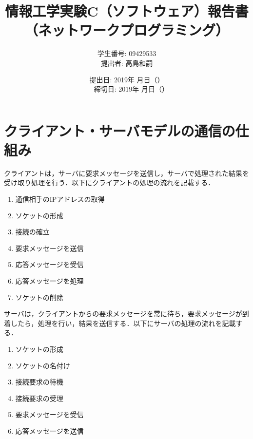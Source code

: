\documentclass{jarticle}[11pt]
\title{{\normalsize 情報工学実験C（ソフトウェア）報告書}\\
    （ネットワークプログラミング）\\
    }
\author{ 
      学生番号: 09429533 \\
      提出者: 高島和嗣
    }
\date{
      提出日: 2019年 月日（） \\　%
      締切日: 2019年 月日（）
    }
\begin{document}
    \maketitle
    \section{クライアント・サーバモデルの通信の仕組み}
    クライアントは，サーバに要求メッセージを送信し，サーバで処理された結果を受け取り処理を行う．以下にクライアントの処理の流れを記載する．
    \begin{enumerate}
    \item 通信相手のIPアドレスの取得 
    \item ソケットの形成
    \item 接続の確立
    \item 要求メッセージを送信
    \item 応答メッセージを受信
    \item 応答メッセージを処理
    \item ソケットの削除
    \end{enumerate}
    サーバは，クライアントからの要求メッセージを常に待ち，要求メッセージが到着したら，処理を行い，結果を送信する．以下にサーバの処理の流れを記載する．
    \begin{enumerate}
    \item ソケットの形成
    \item ソケットの名付け
    \item 接続要求の待機
    \item 接続要求の受理
    \item 要求メッセージを受信
    \item 応答メッセージを送信
    \end{enumerate}

\end{document}
